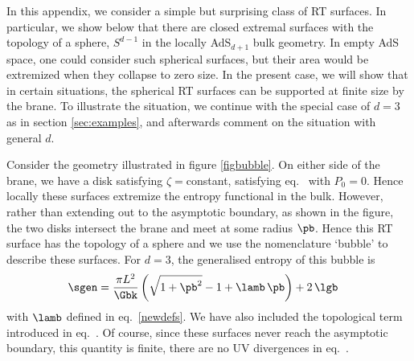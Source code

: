 %







In this appendix, we consider a simple but surprising class of RT surfaces. In particular, we show below that there are closed extremal surfaces with the topology of a sphere, \ie $S^{d-1}$ in the locally AdS$_{d+1}$ bulk geometry. In empty AdS space, one could consider such spherical surfaces, but their area would be extremized when they collapse to zero size. In the present case, we will show that in certain situations, the spherical RT surfaces can be supported at finite size by the brane.  To illustrate the situation, we continue with the special case of $d=3$ as in section \ref{sec:examples}, and afterwards comment on the situation with general $d$. 
%

\begin{figure}[h]
	\def\svgwidth{0.8\linewidth}
\end{figure}

Consider the geometry illustrated in figure \ref{figbubble}. On either side of the brane, we have a disk satisfying $\zeta=$constant, \ie satisfying eq.~ with $P_0=0$. Hence locally these surfaces extremize the entropy functional  in the bulk. However, rather than extending out to the asymptotic boundary, as shown in the figure, the two disks intersect the brane and meet at some radius $\pb$.  Hence this RT surface has the topology of a sphere and we use the nomenclature `bubble' to describe these surfaces. For $d=3$, the generalised entropy  of this bubble is
\begin{align}\label{Agenbubble}
\sgen&=\frac{\pi L^2}{\Gbk} \left(  \sqrt{1+\pb^2}-1  + \lamb\, \pb \right) +2\,\lgb 
\end{align}
with $\lamb$ defined in eq.~\eqref{newdefs}. We have also included the topological term introduced in eq.~.
Of course, since these surfaces never reach the asymptotic boundary, this quantity is finite, \ie there are no UV divergences in eq.~. 

